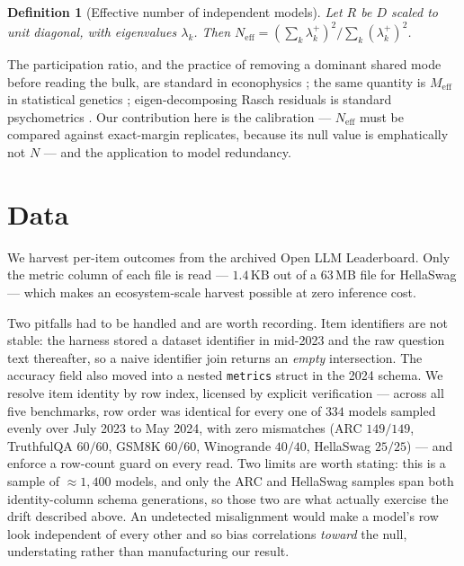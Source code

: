 \documentclass[pdflatex,sn-mathphys-ay]{sn-jnl}
\theoremstyle{thmstyleone}
\theoremstyle{thmstylethree}
\newtheorem{definition}{Definition}
\begin{document}
\begin{definition}[Effective number of independent models]
Let $R$ be $D$ scaled to unit diagonal, with eigenvalues $\lambda_k$. Then
$N_{\text{eff}}=(\sum_k\lambda_k^{+})^2/\sum_k(\lambda_k^{+})^2$.
\end{definition}

The participation ratio, and the practice of removing a dominant shared mode before reading the
bulk, are standard in econophysics \citep{laloux1999,plerou1999}; the same quantity is $M_{\text
{eff}}$ in statistical genetics \citep{cheverud2001,nyholt2004,liji2005}; eigen-decomposing
Rasch residuals is standard psychometrics \citep{linacre1998}. Our contribution here is the
calibration --- $N_{\text{eff}}$ must be compared against exact-margin replicates, because its
null value is emphatically not $N$ --- and the application to model redundancy.

\section{Data}
\label{sec:data}

We harvest per-item outcomes from the archived Open LLM Leaderboard. Only the metric column of
each file is read --- $1.4$\,KB out of a $63$\,MB file for HellaSwag --- which makes an
ecosystem-scale harvest possible at zero inference cost.

Two pitfalls had to be handled and are worth recording. Item identifiers are not stable: the
harness stored a dataset identifier in mid-2023 and the raw question text thereafter, so a naive
identifier join returns an \emph{empty} intersection. The accuracy field also moved into a nested
\texttt{metrics} struct in the 2024 schema. We resolve item identity by row index, licensed by
explicit verification --- across all five benchmarks, row order was identical for every one of
$334$ models sampled evenly over July 2023 to May 2024, with zero mismatches (ARC
$149/149$, TruthfulQA $60/60$, GSM8K $60/60$, Winogrande $40/40$, HellaSwag $25/25$) --- and
enforce a row-count guard on every read. Two limits are worth stating: this is a sample of
$\approx1{,}400$ models, and only the ARC and HellaSwag samples span both identity-column schema
generations, so those two are what actually exercise the drift described above. An undetected
misalignment would make a model's row look independent of every other and so bias correlations
\emph{toward} the null, understating rather than manufacturing our result.
\end{document}

